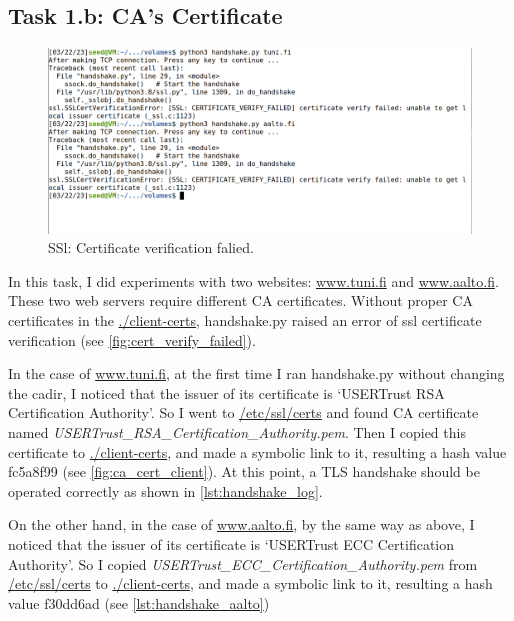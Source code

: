 \subsection{Task 1.b: CA's Certificate}

\begin{figure}[h!]
    \centering
    \includegraphics[height=\textheight,width=\textwidth,keepaspectratio]
    {figures/ssl_cert_verify_failed.png}
    \caption{SSl: Certificate verification falied.}
    \label{fig:cert_verify_failed}
\end{figure}

In this task, I did experiments with two websites: \url{www.tuni.fi} and \url{www.aalto.fi}.
These two web servers require different CA certificates. Without proper CA certificates
in the \url{./client-certs}, {\selectfont handshake.py} raised an error
of ssl certificate verification (see \autoref{fig:cert_verify_failed}).

In the case of \url{www.tuni.fi}, at the first time I ran {\selectfont
handshake.py} without changing the {\selectfont cadir}, I noticed that
the issuer of its certificate is `USERTrust RSA Certification Authority'. So I went to
\url{/etc/ssl/certs} and found CA certificate named
\emph{USERTrust\_RSA\_Certification\_Authority.pem}. Then I copied this certificate to
\url{./client-certs}, and made a symbolic link to it, resulting a hash value
{\selectfont fc5a8f99} (see \autoref{fig:ca_cert_client}). At this point,
a TLS handshake should be operated correctly as shown in \autoref{lst:handshake_log}.

On the other hand, in the case of \url{www.aalto.fi}, by the same way as above, I noticed
that the issuer of its certificate is `USERTrust ECC Certification Authority'. So I copied
\emph{USERTrust\_ECC\_Certification\_Authority.pem} from \url{/etc/ssl/certs} to
\url{./client-certs}, and made a symbolic link to it, resulting a hash value
{\selectfont f30dd6ad} (see \autoref{lst:handshake_aalto})

